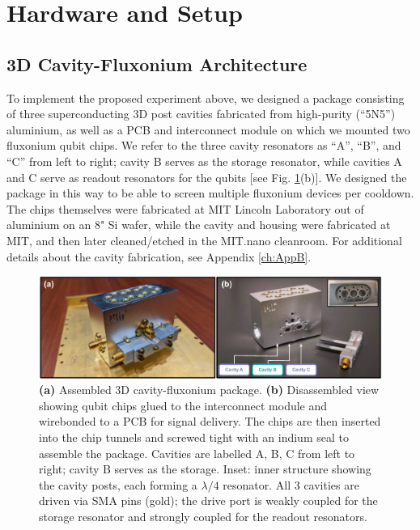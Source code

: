 \clearpage
\section{Hardware and Setup\label{sec:4_Hardware_and_Setup}}

\subsection{3D Cavity-Fluxonium Architecture \label{sec:4_3D_Cavity_Resonators}}
To implement the proposed experiment above, we designed a package consisting of three superconducting 3D post cavities fabricated from high-purity (``5N5'') aluminium, as well as a PCB and interconnect module on which we mounted two fluxonium qubit chips. We refer to the three cavity resonators as ``A'', ``B'', and ``C'' from left to right; cavity B serves as the storage resonator, while cavities A and C serve as readout resonators for the qubits [see Fig. \ref{fig:4-3DGKP-schematic-1}(b)]. We designed the package in this way to be able to screen multiple fluxonium devices per cooldown. The chips themselves were fabricated at MIT Lincoln Laboratory out of aluminium on an 8" Si wafer, while the cavity and housing were fabricated at MIT, and then later cleaned/etched in the MIT.nano cleanroom. For additional details about the cavity fabrication, see Appendix \ref{ch:AppB}. 

\begin{figure}[h]
    \centering
    \includegraphics[width=0.95\linewidth]{Figures/4/3DGKP-Schematic-1.pdf}
    \caption{\textbf{(a)} Assembled 3D cavity-fluxonium package. \textbf{(b)} Disassembled view showing qubit chips glued to the interconnect module and wirebonded to a PCB for signal delivery. The chips are then inserted into the chip tunnels and screwed tight with an indium seal to assemble the package. Cavities are labelled A, B, C from left to right; cavity B serves as the storage. Inset: inner structure showing the cavity posts, each forming a $\lambda/4$ resonator. All 3 cavities are driven via SMA pins (gold); the drive port is weakly coupled for the storage resonator and strongly coupled for the readout resonators.}
    \label{fig:4-3DGKP-schematic-1}
\end{figure}

